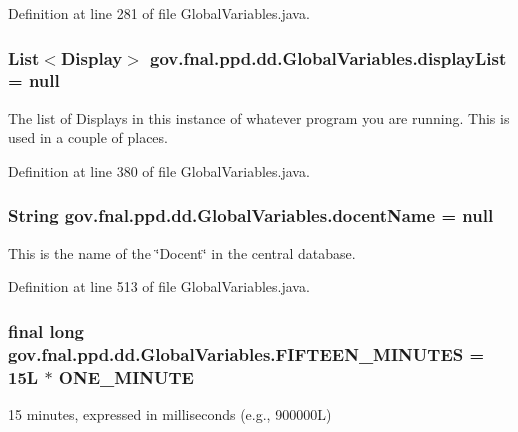 Definition at line 281 of file Global\-Variables.\-java.

\hypertarget{classgov_1_1fnal_1_1ppd_1_1dd_1_1GlobalVariables_a30efdc2ab60dd04f76dc1210b8447426}{
\subsubsection[{display\-List}]{\setlength{\rightskip}{0pt plus 5cm}List$<${\bf Display}$>$ gov.\-fnal.\-ppd.\-dd.\-Global\-Variables.\-display\-List = null\hspace{0.3cm}{\ttfamily [static]}}}\label{classgov_1_1fnal_1_1ppd_1_1dd_1_1GlobalVariables_a30efdc2ab60dd04f76dc1210b8447426}
The list of Displays in this instance of whatever program you are running. This is used in a couple of places. 

Definition at line 380 of file Global\-Variables.\-java.

\hypertarget{classgov_1_1fnal_1_1ppd_1_1dd_1_1GlobalVariables_a1a8699e7b2ec1e9cad652869fedafa2b}{
\subsubsection[{docent\-Name}]{\setlength{\rightskip}{0pt plus 5cm}String gov.\-fnal.\-ppd.\-dd.\-Global\-Variables.\-docent\-Name = null\hspace{0.3cm}{\ttfamily [static]}}}\label{classgov_1_1fnal_1_1ppd_1_1dd_1_1GlobalVariables_a1a8699e7b2ec1e9cad652869fedafa2b}
This is the name of the \char`\"{}\-Docent\char`\"{} in the central database. 

Definition at line 513 of file Global\-Variables.\-java.

\hypertarget{classgov_1_1fnal_1_1ppd_1_1dd_1_1GlobalVariables_ae09d2d42603daf3b4d5fccd1c489a93b}{
\subsubsection[{F\-I\-F\-T\-E\-E\-N\-\_\-\-M\-I\-N\-U\-T\-E\-S}]{\setlength{\rightskip}{0pt plus 5cm}final long gov.\-fnal.\-ppd.\-dd.\-Global\-Variables.\-F\-I\-F\-T\-E\-E\-N\-\_\-\-M\-I\-N\-U\-T\-E\-S = 15\-L $\ast$ O\-N\-E\-\_\-\-M\-I\-N\-U\-T\-E\hspace{0.3cm}{\ttfamily [static]}}}\label{classgov_1_1fnal_1_1ppd_1_1dd_1_1GlobalVariables_ae09d2d42603daf3b4d5fccd1c489a93b}
15 minutes, expressed in milliseconds (e.\-g., 900000\-L) 

